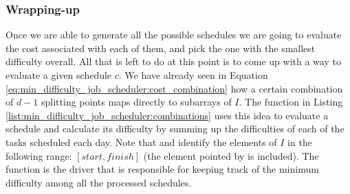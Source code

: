 


\subsubsection{Wrapping-up}
Once we are able to generate all the possible schedules we are going to evaluate the cost associated
with each of them, and pick the one with the smallest difficulty overall. All that is left to do at this
point is to come up with a way to evaluate a given schedule $c$. We have already seen in Equation
\ref{eq:min_difficulty_job_scheduler:cost_combination} how a certain combination of $d-1$ splitting
points maps directly to subarrays of $I$. The function  in Listing
\ref{list:min_difficulty_job_scheduler:combinations} uses this idea to evaluate a schedule and
calculate its difficulty by summing up the difficulties of each of the tasks scheduled each day.
Note that  and  identify the elements of $I$ in the following range:
$[start, finish]$ (the element pointed by  is included). The function
 is the driver that is responsible for keeping
track of the minimum difficulty among all the processed schedules.




